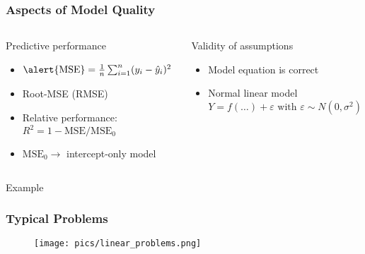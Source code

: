 \documentclass[
    utf8,
    aspectratio=169
]{beamer}  %
\begin{document}
\begin{frame}
	\frametitle{Aspects of Model Quality}
	\begin{columns}[onlytextwidth]
		\begin{block}{Predictive performance}
			\begin{itemize}
				\item $\text{\alert{MSE}} = \frac{1}{n}\sum_{i = 1}^n (y_i - \hat y_i)^2$
				\item Root-MSE (\alert{RMSE})
				\item Relative performance: $R^2 = 1 - \text{MSE}/\text{MSE}_0$
				\item $\text{MSE}_0 \rightarrow$ intercept-only model
			\end{itemize}
		\end{block}	
		
		\begin{block}{Validity of assumptions}
			\begin{itemize}
				\item Model equation is correct
				\item \alert{Normal} linear model
				$$
				Y = f(\dots) + \varepsilon \text{ with }
				\varepsilon \sim N(0, \sigma^2)
				$$
			\end{itemize}
		\end{block}
	\end{columns}
	
	\vfill
	
	\begin{exampleblock}{\centering Example}
	\end{exampleblock}
\end{frame}

\begin{frame}
	\frametitle{Typical Problems}
	\begin{figure}
		\texttt{[image: pics/linear\_problems.png]}
	\end{figure}
\end{frame}
\end{document}
